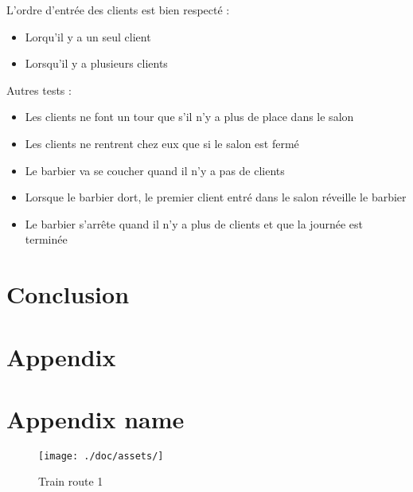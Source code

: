 \documentclass{article}
\begin{document}
    L'ordre d'entrée des clients est bien respecté :
    \begin{itemize}
        \item Lorqu'il y a un seul client
        \item Lorsqu'il y a plusieurs clients
    \end{itemize}

    Autres tests :
    \begin{itemize}
        \item Les clients ne font un tour que s'il n'y a plus de place dans le salon
        \item Les clients ne rentrent chez eux que si le salon est fermé
        \item Le barbier va se coucher quand il n'y a pas de clients
        \item Lorsque le barbier dort, le premier client entré dans le salon réveille le barbier
        \item Le barbier s'arrête quand il n'y a plus de clients et que la journée est terminée
    \end{itemize}

    \section{Conclusion}

    \section*{Appendix}

    \section{Appendix name}
    \begin{figure}[!htb]
        \centering
        \texttt{[image: ./doc/assets/]}
        \caption{Train route 1}
    \end{figure}
\end{document}
